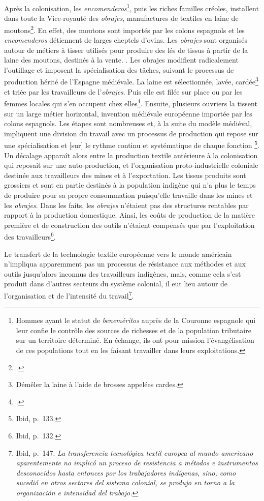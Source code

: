 Après la colonisation, les \textit{encomenderos}\footnote{Hommes ayant le statut de \textit{beneméritos} auprès de la Couronne espagnole qui leur confie le contrôle des sources de richesses et de la population tributaire sur un territoire déterminé. En échange, ils ont pour mission l'évangélisation de ces populations tout en les faisant travailler dans leurs exploitations.}, puis les riches familles créoles, installent dans toute la Vice-royauté des \textit{obrajes}, manufactures de textiles en laine de moutons\footcite{ortizdelatabladucasseObrajesObrajerosQuito1982}. En effet, des moutons sont importés par les colons espagnols et les \textit{encomenderos} détiennent de larges cheptels d'ovins. 
Les \textit{obrajes} sont organisés autour de métiers à tisser utilisés pour produire des lés de tissus à partir de la laine des moutons, destinés à la vente. . Les obrajes modifient radicalement l'outillage et imposent la spécialisation des tâches, suivant le processus de production hérité de l'Espagne médiévale. La laine est sélectionnée, lavée, cardée\footnote{Démêler la laine à l'aide de brosses appelées cardes.} et triée par les travailleurs de l'\textit{obrajes}. Puis elle est filée sur place ou par les femmes locales qui s'en occupent chez elles\footcite[p.49]{minogrijalvaManufacturaColonialConstitucion1993}. Ensuite, plusieurs ouvriers la tissent sur un large métier horizontal, invention médiévale européenne importée par les colons espagnols. Les étapes sont nombreuses et, à la suite du modèle médiéval, impliquent une division du travail avec un processus de production qui repose sur une \og spécialisation et [sur] le rythme continu et systématique de chaque fonction \fg\footnote{Ibid, p.~133.}. Un décalage apparaît alors entre la production textile antérieure à la colonisation qui reposait sur une auto-production, et l'organisation proto-industrielle coloniale destinée aux travailleurs des mines et à l'exportation. Les tissus produits sont grossiers et sont en partie destinés à la population indigène qui n'a plus le temps de produire pour sa propre consommation puisqu'elle travaille dans les mines et les \textit{obrajes}. Dans les faits, les \textit{obrajes} n'étaient pas des structures rentables par rapport à la production domestique. Ainsi, les coûts de production de la matière première et de construction des outils n'étaient compensés que par l'exploitation des travailleurs\footnote{Ibid, p.~132.}.
\begin{citer}
	Le transfert de la technologie textile européenne vers le monde américain n'impliqua apparemment pas un processus de résistance aux méthodes et aux outils jusqu'alors inconnus des travailleurs indigènes, mais, comme cela s'est produit dans d'autres secteurs du système colonial, il eut lieu autour de l'organisation et de l'intensité du travail\footnote{Ibid, p.~147. \textit{La transferencia tecnológica textil europea al mundo americano aparentemente no implicó un proceso de resistencia a métodos e instrumentos desconocidos hasta entonces por los trabajadores indígenas, sino, como sucedió en otros sectores del sistema colonial, se produjo en torno a la organización e intensidad del trabajo.}}.
\end{citer}
